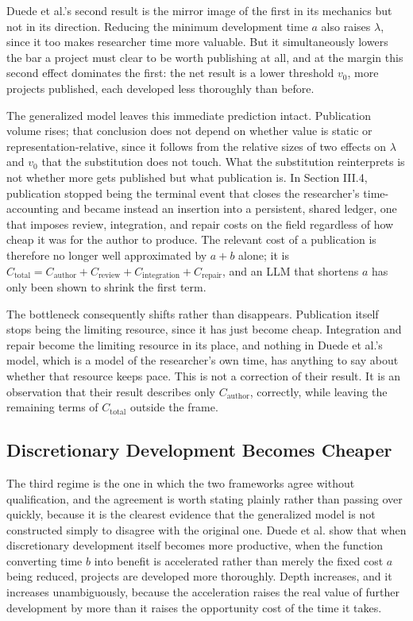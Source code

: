 \documentclass[11pt]{article}
\begin{document}
Duede et al.'s second result is the mirror image of the first in its mechanics but not in its direction. Reducing the minimum development time $a$ also raises $\lambda$, since it too makes researcher time more valuable. But it simultaneously lowers the bar a project must clear to be worth publishing at all, and at the margin this second effect dominates the first: the net result is a lower threshold $v_0$, more projects published, each developed less thoroughly than before.

The generalized model leaves this immediate prediction intact. Publication volume rises; that conclusion does not depend on whether value is static or representation-relative, since it follows from the relative sizes of two effects on $\lambda$ and $v_0$ that the substitution does not touch. What the substitution reinterprets is not whether more gets published but what publication is. In Section III.4, publication stopped being the terminal event that closes the researcher's time-accounting and became instead an insertion into a persistent, shared ledger, one that imposes review, integration, and repair costs on the field regardless of how cheap it was for the author to produce. The relevant cost of a publication is therefore no longer well approximated by $a + b$ alone; it is $C_{\text{total}} = C_{\text{author}} + C_{\text{review}} + C_{\text{integration}} + C_{\text{repair}}$, and an LLM that shortens $a$ has only been shown to shrink the first term.

The bottleneck consequently shifts rather than disappears. Publication itself stops being the limiting resource, since it has just become cheap. Integration and repair become the limiting resource in its place, and nothing in Duede et al.'s model, which is a model of the researcher's own time, has anything to say about whether that resource keeps pace. This is not a correction of their result. It is an observation that their result describes only $C_{\text{author}}$, correctly, while leaving the remaining terms of $C_{\text{total}}$ outside the frame.

\subsection{Discretionary Development Becomes Cheaper}

The third regime is the one in which the two frameworks agree without qualification, and the agreement is worth stating plainly rather than passing over quickly, because it is the clearest evidence that the generalized model is not constructed simply to disagree with the original one. Duede et al. show that when discretionary development itself becomes more productive, when the function converting time $b$ into benefit is accelerated rather than merely the fixed cost $a$ being reduced, projects are developed more thoroughly. Depth increases, and it increases unambiguously, because the acceleration raises the real value of further development by more than it raises the opportunity cost of the time it takes.
\end{document}

